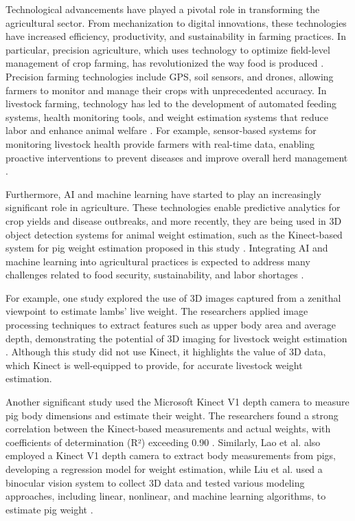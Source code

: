 {Technological advancements have played a pivotal role in transforming the agricultural sector. From mechanization to digital innovations, these technologies have increased efficiency, productivity, and sustainability in farming practices. In particular, precision agriculture, which uses technology to optimize field-level management of crop farming, has revolutionized the way food is produced \citep{witten1993practical}. Precision farming technologies include GPS, soil sensors, and drones, allowing farmers to monitor and manage their crops with unprecedented accuracy.
In livestock farming, technology has led to the development of automated feeding systems, health monitoring tools, and weight estimation systems that reduce labor and enhance animal welfare \citep{gomez2021systematic}. For example, sensor-based systems for monitoring livestock health provide farmers with real-time data, enabling proactive interventions to prevent diseases and improve overall herd management \citep{neethirajan2021digital}.

Furthermore, AI and machine learning have started to play an increasingly significant role in agriculture. These technologies enable predictive analytics for crop yields and disease outbreaks, and more recently, they are being used in 3D object detection systems for animal weight estimation, such as the Kinect-based system for pig weight estimation proposed in this study \citep{farooqui2024precision}. Integrating AI and machine learning into agricultural practices is expected to address many challenges related to food security, sustainability, and labor shortages \citep{ng2023machine}.

For example, one study explored the use of 3D images captured from a zenithal viewpoint to estimate lambs' live weight. The researchers applied image processing techniques to extract features such as upper body area and average depth, demonstrating the potential of 3D imaging for livestock weight estimation \citep{samperio2021lambs}. Although this study did not use Kinect, it highlights the value of 3D data, which Kinect is well-equipped to provide, for accurate livestock weight estimation.

Another significant study used the Microsoft Kinect V1 depth camera to measure pig body dimensions and estimate their weight. The researchers found a strong correlation between the Kinect-based measurements and actual weights, with coefficients of determination (R²) exceeding 0.90 \citep{pezzuolo2018barn}. Similarly, Lao et al. also employed a Kinect V1 depth camera to extract body measurements from pigs, developing a regression model for weight estimation, while Liu et al. used a binocular vision system to collect 3D data and tested various modeling approaches, including linear, nonlinear, and machine learning algorithms, to estimate pig weight \citep{li2014estimation}.


}
